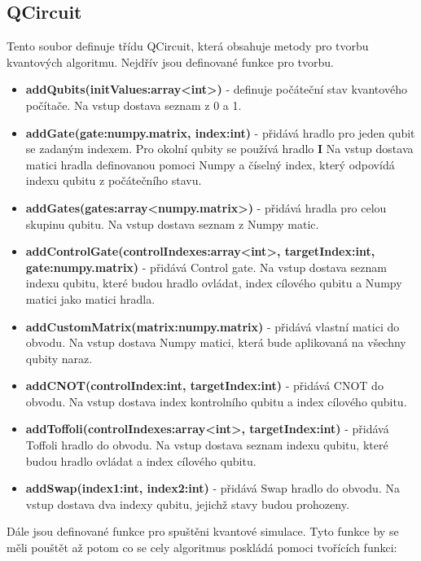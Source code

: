 \documentclass[11pt]{article}
\begin{document}
\subsection{QCircuit}
Tento soubor definuje třídu QCircuit, která obsahuje metody pro tvorbu kvantových algoritmu.
Nejdřív jsou definované funkce pro tvorbu.
\begin{itemize}
    \item \textbf{addQubits(initValues:array<int>)} - definuje počáteční stav kvantového počítače.
          Na vstup dostava seznam z 0 a 1.
    \item \textbf{addGate(gate:numpy.matrix, index:int)} - přidává hradlo pro jeden qubit se zadaným indexem.
          Pro okolní qubity se používá hradlo \textbf{I}
          Na vstup dostava matici hradla definovanou pomoci Numpy a číselný index, který odpovídá indexu qubitu z počátečního stavu.
    \item \textbf{addGates(gates:array<numpy.matrix>)} - přidává hradla pro celou skupinu qubitu.
          Na vstup dostava seznam z Numpy matic.
    \item \textbf{addControlGate(controlIndexes:array<int>, targetIndex:int, gate:numpy.matrix)} - přidává Control gate.
          Na vstup dostava seznam indexu qubitu, které budou hradlo ovládat, index cílového qubitu a Numpy matici jako matici hradla.
    \item \textbf{addCustomMatrix(matrix:numpy.matrix)} - přidává vlastní matici do obvodu.
          Na vstup dostava Numpy matici, která bude aplikovaná na všechny qubity naraz.
    \item \textbf{addCNOT(controlIndex:int, targetIndex:int)} - přidává CNOT do obvodu.
          Na vstup dostava index kontrolního qubitu a index cílového qubitu.
    \item \textbf{addToffoli(controlIndexes:array<int>, targetIndex:int)} - přidává Toffoli hradlo do obvodu.
          Na vstup dostava seznam indexu qubitu, které budou hradlo ovládat a index cílového qubitu.
    \item \textbf{addSwap(index1:int, index2:int)} - přidává Swap hradlo do obvodu.
          Na vstup dostava dva indexy qubitu, jejichž stavy budou prohozeny.
\end{itemize}
\par Dále jsou definované funkce pro spuštěni kvantové simulace.
Tyto funkce by se měli pouštět až potom co se cely algoritmus poskládá pomoci tvořících funkci:
\end{document}
